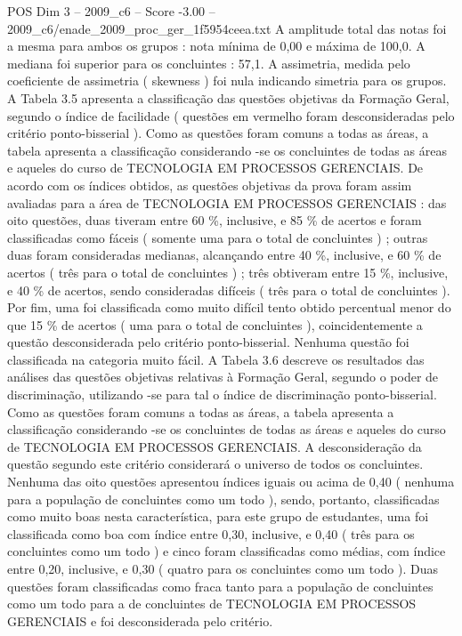\begin{textsample}{POS Dim 3 – 2009\_c6 – Score -3.00 – 2009\_c6/enade\_2009\_proc\_ger\_1f5954ceea.txt}
A amplitude total das notas foi a mesma para ambos os grupos : nota mínima de 0,00 e máxima de 100,0.
A mediana foi superior para os concluintes : 57,1.
A assimetria, medida pelo coeficiente de assimetria ( skewness ) foi nula indicando simetria para os grupos.
A Tabela 3.5 apresenta a classificação das questões objetivas da Formação Geral, segundo o índice de facilidade ( questões em vermelho foram desconsideradas pelo critério ponto-bisserial ).
Como as questões foram comuns a todas as áreas, a tabela apresenta a classificação considerando -se os concluintes de todas as áreas e aqueles do curso de TECNOLOGIA EM PROCESSOS GERENCIAIS.
De acordo com os índices obtidos, as questões objetivas da prova foram assim avaliadas para a área de TECNOLOGIA EM PROCESSOS GERENCIAIS : das oito questões, duas tiveram entre 60 \%, inclusive, e 85 \% de acertos e foram classificadas como fáceis ( somente uma para o total de concluintes ) ; outras duas foram consideradas medianas, alcançando entre 40 \%, inclusive, e 60 \% de acertos ( três para o total de concluintes ) ; três obtiveram entre 15 \%, inclusive, e 40 \% de acertos, sendo consideradas difíceis ( três para o total de concluintes ).
Por fim, uma foi classificada como muito difícil tento obtido percentual menor do que 15 \% de acertos ( uma para o total de concluintes ), coincidentemente a questão desconsiderada pelo critério ponto-bisserial.
Nenhuma questão foi classificada na categoria muito fácil.
A Tabela 3.6 descreve os resultados das análises das questões objetivas relativas à Formação Geral, segundo o poder de discriminação, utilizando -se para tal o índice de discriminação ponto-bisserial.
Como as questões foram comuns a todas as áreas, a tabela apresenta a classificação considerando -se os concluintes de todas as áreas e aqueles do curso de TECNOLOGIA EM PROCESSOS GERENCIAIS.
A desconsideração da questão segundo este critério considerará o universo de todos os concluintes.
Nenhuma das oito questões apresentou índices iguais ou acima de 0,40 ( nenhuma para a população de concluintes como um todo ), sendo, portanto, classificadas como muito boas nesta característica, para este grupo de estudantes, uma foi classificada como boa com índice entre 0,30, inclusive, e 0,40 ( três para os concluintes como um todo ) e cinco foram classificadas como médias, com índice entre 0,20, inclusive, e 0,30 ( quatro para os concluintes como um todo ).
Duas questões foram classificadas como fraca tanto para a população de concluintes como um todo para a de concluintes de TECNOLOGIA EM PROCESSOS GERENCIAIS e foi desconsiderada pelo critério.

\end{textsample}
